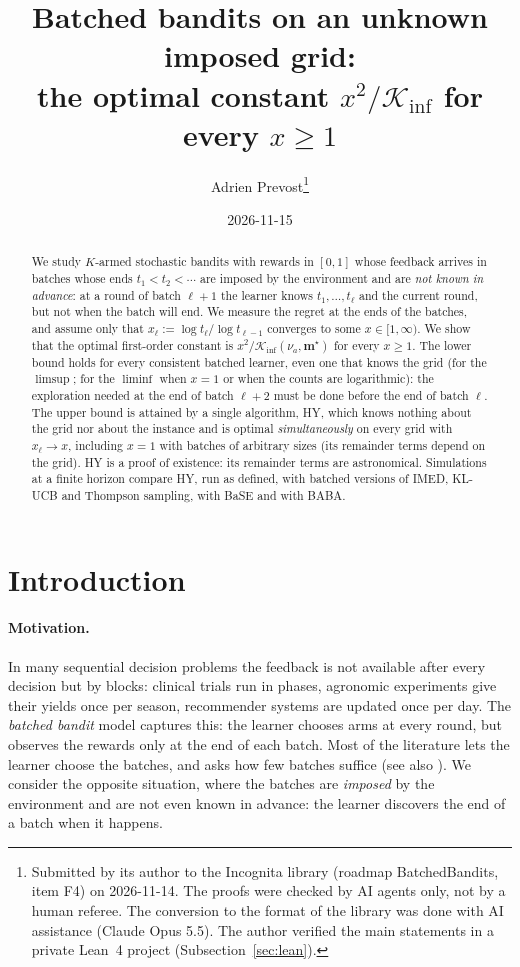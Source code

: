 \documentclass[10pt]{article}
\title{Batched bandits on an unknown imposed grid:\\ the optimal constant $x^2/\mathcal K_{\inf}$ for every $x\ge1$}
\author{Adrien Prevost\thanks{Submitted by its author to the Incognita library (roadmap BatchedBandits, item F4) on
  2026-11-14. The proofs were checked by AI agents only, not by a human referee. The conversion to the format of the
  library was done with AI assistance (Claude Opus 5.5). The author verified the main statements in a private Lean~4
  project (Subsection~\ref{sec:lean}).}}
\date{2026-11-15}
\newcommand{\1}{\mathbf{1}}
\begin{document}
\sloppy
\maketitle

\begin{abstract}
We study $K$-armed stochastic bandits with rewards in $[0,1]$ whose feedback arrives in batches whose ends $t_1<t_2<\cdots$ are imposed by the environment and are
\emph{not known in advance}: at a round of batch $\ell+1$ the learner knows $t_1,\dots,t_\ell$ and the current round, but not when the batch will end. We measure the
regret at the ends of the batches, and assume only that $x_\ell:=\log t_\ell/\log t_{\ell-1}$ converges to some $x\in[1,\infty)$. We show that the optimal first-order
constant is $x^2/\mathcal K_{\inf}(\nu_a,\mathbf m^\star)$ for every $x\ge1$. The lower bound holds for every consistent batched learner, even one that knows the grid
(for the $\limsup$; for the $\liminf$ when $x=1$ or when the counts are logarithmic): the exploration needed at the end of batch $\ell+2$ must be done before the end of
batch $\ell$. The upper bound is attained by a single algorithm, HY, which knows nothing about the grid nor about the instance and is optimal \emph{simultaneously} on every
grid with $x_\ell\to x$, including $x=1$ with batches of arbitrary sizes (its remainder terms depend on the grid). HY is a proof of existence: its
remainder terms are astronomical. Simulations at a finite horizon compare HY, run as defined, with batched versions of IMED, KL-UCB and Thompson sampling,
with BaSE and with BABA.
\end{abstract}

\setcounter{tocdepth}{1}
\tableofcontents

\section{Introduction}\label{sec:intro}

\paragraph{Motivation.} In many sequential decision problems the feedback is not available after every decision but by blocks: clinical trials run in phases, agronomic experiments give
their yields once per season, recommender systems are updated once per day. The \emph{batched bandit} model captures this: the learner chooses arms at every round, but
observes the rewards only at the end of each batch. Most of the literature lets the learner choose the batches, and asks how few batches suffice
\citep{PRCS16,GHRZ19,JTXHXG21} (see also \citealp{EKMM21}). We consider the opposite situation, where the batches are \emph{imposed} by the environment
and are not even known in advance: the learner discovers the end of a batch when it happens.
\end{document}
